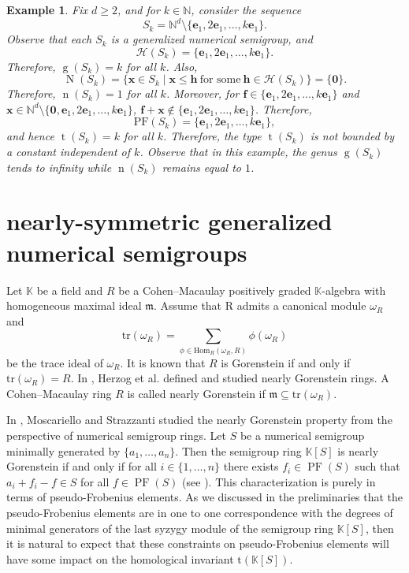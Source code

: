 \documentclass[12pt]{amsart}
\theoremstyle{plain}
\theoremstyle{theorem}
\newtheorem{example}[definition]{Example}
\theoremstyle{remark}
\begin{document}
	\begin{example}\label{ex:remove-line}
{\rm Fix $d \geq 2$, and for $k \in \mathbb{N}$, consider the sequence \[S_k = \mathbb{N}^d \setminus \{\mathbf{e}_1, 2\mathbf{e}_1, \ldots, k\mathbf{e}_1\}.\]
Observe that each $S_k$ is a generalized numerical semigroup, and \[\mathcal{H}(S_k) = \{\mathbf{e}_1, 2\mathbf{e}_1, \ldots, k\mathbf{e}_1\}.\] Therefore, $\operatorname{g}(S_k) = k$ for all $k$. Also, 
\[\operatorname{N}(S_k) = \{\mathbf{x} \in S_k \mid \mathbf{x} \leq \mathbf{h} ~\text{for some}~ \mathbf{h} \in \mathcal{H}(S_k) \}= \{\mathbf{0}\}.\] Therefore, $\operatorname{n}(S_k) = 1$ for all $k$. Moreover, for $\mathbf{f} \in \{\mathbf{e}_1, 2\mathbf{e}_1, \ldots, k\mathbf{e}_1\}$ and $\mathbf{x} \in \mathbb{N}^d \setminus \{\mathbf{0}, \mathbf{e}_1, 2\mathbf{e}_1, \ldots, k\mathbf{e}_1\}$, $\mathbf{f} + \mathbf{x} \notin \{\mathbf{e}_1, 2\mathbf{e}_1, \ldots, k\mathbf{e}_1\}$. Therefore, 
\[\mathrm{PF}(S_k) = \{\mathbf{e}_1, 2\mathbf{e}_1, \ldots, k\mathbf{e}_1\},\] and hence $\operatorname{t}(S_k) = k$ for all $k$. Therefore, the type $\operatorname{t}(S_k)$ is not bounded by a constant independent of $k$. Observe that in this example, the genus $\operatorname{g}(S_k)$ tends to infinity while $\operatorname{n}(S_k)$ remains equal to $1$. }
\end{example} 

\section{nearly-symmetric generalized numerical semigroups}\label{sec:NS}

Let $\mathbb{K}$ be a field and $R$ be a Cohen--Macaulay positively graded $\mathbb{K}$-algebra with homogeneous maximal ideal $\mathfrak{m}$. Assume that R admits a canonical module $\omega_R$ and 
$$\mathrm{tr}(\omega_R) = \sum_{\phi \in \mathrm{Hom}_{R}(\omega_R,R)} \phi(\omega_R)$$
be the trace ideal of $\omega_R$. It is known that $R$ is Gorenstein if and only if $\mathrm{tr}(\omega_R) = R.$ In \cite{Herzog-et-al2019}, Herzog et al. defined and studied nearly Gorenstein rings. A Cohen--Macaulay ring $R$ is called nearly Gorenstein if $\mathfrak{m} \subseteq \mathrm{tr}(\omega_R)$. 

\medskip
In \cite{Moscaeiello-Strazzanti2021}, Moscariello and Strazzanti studied the nearly Gorenstein property from the perspective of numerical semigroup rings. Let $S$ be a numerical semigroup minimally generated by $\{a_1, \ldots,a_n\}$. Then the semigroup ring $\mathbb{K}[S]$ is nearly Gorenstein if and only if for all $i\in\{1,\ldots,n\}$ there exists $f_i\in \operatorname{PF}(S)$ such that $a_i+f_i-f\in S$ for all $f \in \operatorname{PF}(S)$ (see \cite[Proposition~1.1]{Moscaeiello-Strazzanti2021}). This characterization is purely in terms of pseudo-Frobenius elements. As we discussed in the preliminaries that the pseudo-Frobenius elements are in one to one correspondence with the degrees of minimal generators of the last syzygy module of the semigroup ring $\mathbb{K}[S]$, then it is natural to expect that these constraints on pseudo-Frobenius elements will have some impact on the homological invariant  $\mathrm{t}(\mathbb{K}[S])$. 
\end{document}
